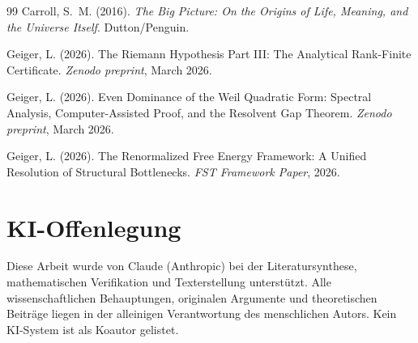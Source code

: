 \documentclass[12pt,a4paper]{article}
\theoremstyle{remark}
\begin{document}
\begin{thebibliography}{99}
Carroll, S.~M. (2016).
\newblock \textit{The Big Picture: On the Origins of Life, Meaning, and the Universe Itself}.
\newblock Dutton/Penguin.

Geiger, L. (2026).
\newblock The Riemann Hypothesis Part III: The Analytical Rank-Finite Certificate.
\newblock \textit{Zenodo preprint}, March 2026.

Geiger, L. (2026).
\newblock Even Dominance of the Weil Quadratic Form: Spectral Analysis, Computer-Assisted Proof, and the Resolvent Gap Theorem.
\newblock \textit{Zenodo preprint}, March 2026.

Geiger, L. (2026).
\newblock The Renormalized Free Energy Framework: A Unified Resolution of Structural Bottlenecks.
\newblock \textit{FST Framework Paper}, 2026.

\end{thebibliography}

\section*{KI-Offenlegung}
Diese Arbeit wurde von Claude (Anthropic) bei der Literatursynthese, mathematischen Verifikation und Texterstellung unterst\"utzt. Alle wissenschaftlichen Behauptungen, originalen Argumente und theoretischen Beitr\"age liegen in der alleinigen Verantwortung des menschlichen Autors. Kein KI-System ist als Koautor gelistet.
\end{document}
